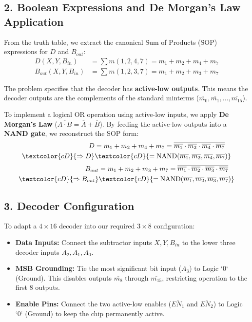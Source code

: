 \documentclass[12pt,a3paper]{article}
\begin{document}
\begin{enumerate}
\begin{tcolorbox}[enhanced,breakable,ansbox,colback=cD!4,colframe=cD,boxrule=0.8pt,arc=5pt,title={\textbf{Answer}},fonttitle=\bfseries\color{white},colbacktitle=cD]
\subsection*{2. Boolean Expressions and De Morgan's Law Application}

From the truth table, we extract the canonical Sum of Products (SOP) expressions for $D$ and $B_{out}$:
\begin{align*}
    D(X, Y, B_{in}) &= \sum m(1, 2, 4, 7) = m_1 + m_2 + m_4 + m_7 \\
    B_{out}(X, Y, B_{in}) &= \sum m(1, 2, 3, 7) = m_1 + m_2 + m_3 + m_7
\end{align*}

The problem specifies that the decoder has \textbf{active-low outputs}. This means the decoder outputs are the complements of the standard minterms ($\overline{m_0}, \overline{m_1}, \dots, \overline{m_{15}}$). 

To implement a logical OR operation using active-low inputs, we apply \textbf{De Morgan's Law} ($\overline{A \cdot B} = \overline{A} + \overline{B}$). By feeding the active-low outputs into a \textbf{NAND gate}, we reconstruct the SOP form:
\begin{align*}
    D &= m_1 + m_2 + m_4 + m_7 = \overline{ \overline{m_1} \cdot \overline{m_2} \cdot \overline{m_4} \cdot \overline{m_7} } \\
    \textcolor{cD}{\Rightarrow D} &\textcolor{cD}{= \text{NAND}(\overline{m_1}, \overline{m_2}, \overline{m_4}, \overline{m_7})} 
\end{align*}
\begin{align*}
    B_{out} &= m_1 + m_2 + m_3 + m_7 = \overline{ \overline{m_1} \cdot \overline{m_2} \cdot \overline{m_3} \cdot \overline{m_7} } \\
    \textcolor{cD}{\Rightarrow B_{out}} &\textcolor{cD}{= \text{NAND}(\overline{m_1}, \overline{m_2}, \overline{m_3}, \overline{m_7})}
\end{align*}

\subsection*{3. Decoder Configuration}

To adapt a $4 \times 16$ decoder into our required $3 \times 8$ configuration:
\begin{itemize}
    \item \textbf{Data Inputs:} Connect the subtractor inputs $X, Y, B_{in}$ to the lower three decoder inputs $A_2, A_1, A_0$.
    \item \textbf{MSB Grounding:} Tie the most significant bit input ($A_3$) to Logic `0` (Ground). This disables outputs $\overline{m_8}$ through $\overline{m_{15}}$, restricting operation to the first 8 outputs.
    \item \textbf{Enable Pins:} Connect the two active-low enables ($\overline{EN_1}$ and $\overline{EN_2}$) to Logic `0` (Ground) to keep the chip permanently active.
\end{itemize}


\end{tcolorbox}
\end{enumerate}
\end{document}
